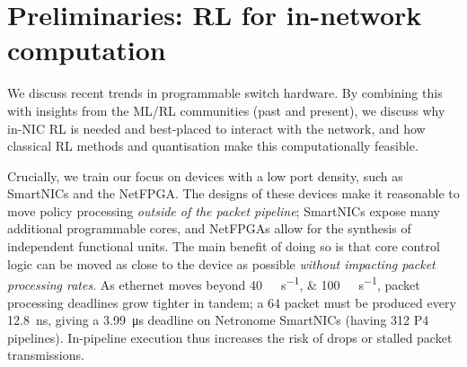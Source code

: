 \documentclass[
sigconf,natbib=false
]{acmart}
\begin{document}
%

\section{Preliminaries: RL for in-network computation}\label{sec:motivation}
We discuss recent trends in programmable switch hardware.
By combining this with insights from the ML/RL communities (past and present), we discuss why in-NIC RL is needed and best-placed to interact with the network, and how classical RL methods and quantisation make this computationally feasible.

Crucially, we train our focus on devices with a low port density, such as SmartNICs and the NetFPGA.
The designs of these devices make it reasonable to move policy processing \emph{outside of the packet pipeline}; SmartNICs expose many additional programmable cores, and NetFPGAs allow for the synthesis of independent functional units.
The main benefit of doing so is that core control logic can be moved as close to the device as possible \emph{without impacting packet processing rates}.
As ethernet moves beyond \SIlist{40;100}{\giga\bit\per\second}, packet processing deadlines grow tighter in tandem; a \SI{64}{\byte} packet must be produced every \SI{12.8}{\nano\second}, giving a \SI{3.99}{\micro\second} deadline on Netronome SmartNICs (having \num{312} P4 pipelines).
In-pipeline execution thus increases the risk of drops or stalled packet transmissions.


\end{document}
